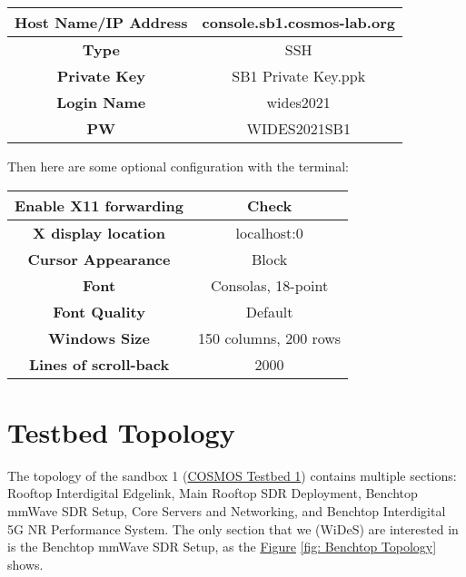 \documentclass{article}
\begin{document}
    \begin{center}
        \begin{tabular}{|c|c|}
            \hline
            \textbf{Host Name/IP Address} &  console.sb1.cosmos-lab.org \\
            \hline
            \textbf{Type} &  SSH \\
            \hline
            \textbf{Private Key} &  SB1 Private Key.ppk \\
            \hline
            \textbf{Login Name} &  wides2021 \\
            \hline
            \textbf{PW} &  WIDES2021SB1 \\ [1ex]
            \hline
        \end{tabular}
    \end{center}
    
    Then here are some optional configuration with the terminal:
    
    \begin{center}
        \begin{tabular}{|c|c|}
            \hline
            \textbf{Enable X11 forwarding} &  Check \\
            \hline
            \textbf{X display location} &  localhost:0 \\
            \hline
            \textbf{Cursor Appearance} &  Block \\
            \hline
            \textbf{Font} &  Consolas, 18-point \\
            \hline
            \textbf{Font Quality} &  Default \\
            \hline
            \textbf{Windows Size} &  150 columns, 200 rows \\
            \hline
            \textbf{Lines of scroll-back} &  2000 \\ [1ex]
            \hline
        \end{tabular}
    \end{center}




\section{Testbed Topology}
    The topology of the sandbox 1 (\href{https://wiki.cosmos-lab.org/wiki/Architecture/Domains/cosmos_sb1}{COSMOS Testbed 1}) contains multiple sections: Rooftop Interdigital Edgelink, Main Rooftop SDR Deployment, Benchtop mmWave SDR Setup, Core Servers and Networking, and Benchtop Interdigital 5G NR Performance System. The only section that we (WiDeS) are interested in is the Benchtop mmWave SDR Setup, as the \href{https://drive.google.com/file/d/1JYIPm89wtZSJL_tOgenqYn6T9bT1dQ3F/view?usp=sharing}{Figure} \ref{fig: Benchtop Topology} shows. 
    
\end{document}
